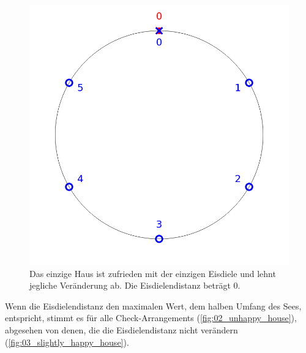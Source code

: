 \documentclass[a4paper,10pt,ngerman,captions=figureheading]{scrartcl}
\newcommand{\imageWidth}{0.3\linewidth}
\begin{document}
\begin{figure}[ht]
    \centering
    \caption{Das einzige Haus ist zufrieden mit der einzigen Eisdiele und lehnt jegliche Veränderung ab. Die Eisdielendistanz beträgt $0$.}
    \label{fig:01_hapy_house}
    \includegraphics[width=\imageWidth]{01_happy_house.png}
\end{figure}

Wenn die Eisdielendistanz den maximalen Wert, dem halben Umfang des Sees, entspricht, stimmt es für alle Check-Arrangements (\autoref{fig:02_unhappy_house}), abgesehen von denen, die die Eisdielendistanz nicht verändern (\autoref{fig:03_slightly_happy_house}).
\end{document}
